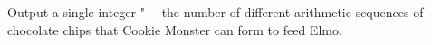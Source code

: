 Output a single integer "--- the number of different arithmetic sequences of chocolate chips that Cookie Monster can form to feed Elmo.
